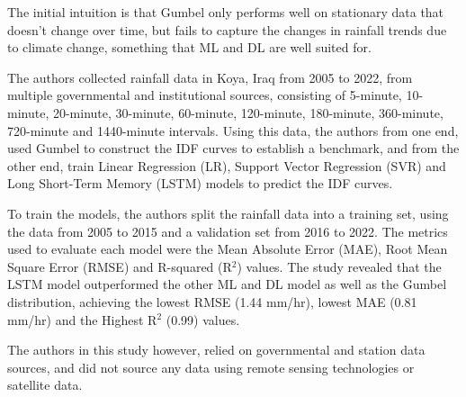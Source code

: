 The initial intuition is that Gumbel only performs well on stationary data that doesn't change over time, but fails to capture the changes in rainfall trends due to climate change, something that ML and DL are well suited for.~\cite{idfkoya}

The authors collected rainfall data in Koya, Iraq from 2005 to 2022, from multiple governmental and institutional sources, consisting of 5-minute, 10-minute, 20-minute, 30-minute, 60-minute, 120-minute, 180-minute, 360-minute, 720-minute and 1440-minute intervals. Using this data, the authors from one end, used Gumbel to construct the IDF curves to establish a benchmark, and from the other end, train Linear Regression (LR), Support Vector Regression (SVR) and Long Short-Term Memory (LSTM) models to predict the IDF curves.~\cite{idfkoya}

To train the models, the authors split the rainfall data into a training set, using the data from 2005 to 2015 and a validation set from 2016 to 2022. The metrics used to evaluate each model were the Mean Absolute Error (MAE), Root Mean Square Error (RMSE) and R-squared (R$^{2}$) values. The study revealed that the LSTM model outperformed the other ML and DL model as well as the Gumbel distribution, achieving the lowest RMSE (1.44 mm/hr), lowest MAE (0.81 mm/hr) and the Highest R$^{2}$ (0.99) values.~\cite{idfkoya}

The authors in this study however, relied on governmental and station data sources, and did not source any data using remote sensing technologies or satellite data.

\vspace{1em}

